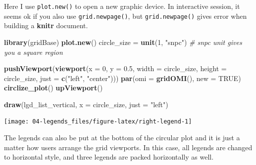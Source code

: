 \documentclass[]{book}
\newenvironment{Shaded}{\begin{snugshade}}{\end{snugshade}}
\newcommand{\KeywordTok}[1]{\textcolor[rgb]{0.13,0.29,0.53}{\textbf{#1}}}
\newcommand{\DataTypeTok}[1]{\textcolor[rgb]{0.13,0.29,0.53}{#1}}
\newcommand{\DecValTok}[1]{\textcolor[rgb]{0.00,0.00,0.81}{#1}}
\newcommand{\FloatTok}[1]{\textcolor[rgb]{0.00,0.00,0.81}{#1}}
\newcommand{\StringTok}[1]{\textcolor[rgb]{0.31,0.60,0.02}{#1}}
\newcommand{\CommentTok}[1]{\textcolor[rgb]{0.56,0.35,0.01}{\textit{#1}}}
\newcommand{\OtherTok}[1]{\textcolor[rgb]{0.56,0.35,0.01}{#1}}
\newcommand{\NormalTok}[1]{#1}
\begin{document}
Here I use \texttt{plot.new()} to open a new graphic device. In
interactive session, it seems ok if you also use
\texttt{grid.newpage()}, but \texttt{grid.newpage()} gives error when
building a \textbf{knitr} document.

\begin{Shaded}
\begin{Highlighting}[]
\KeywordTok{library}\NormalTok{(gridBase)}
\KeywordTok{plot.new}\NormalTok{()}
\NormalTok{circle_size =}\StringTok{ }\KeywordTok{unit}\NormalTok{(}\DecValTok{1}\NormalTok{, }\StringTok{"snpc"}\NormalTok{) }\CommentTok{# snpc unit gives you a square region}

\KeywordTok{pushViewport}\NormalTok{(}\KeywordTok{viewport}\NormalTok{(}\DataTypeTok{x =} \DecValTok{0}\NormalTok{, }\DataTypeTok{y =} \FloatTok{0.5}\NormalTok{, }\DataTypeTok{width =}\NormalTok{ circle_size, }\DataTypeTok{height =}\NormalTok{ circle_size,}
    \DataTypeTok{just =} \KeywordTok{c}\NormalTok{(}\StringTok{"left"}\NormalTok{, }\StringTok{"center"}\NormalTok{)))}
\KeywordTok{par}\NormalTok{(}\DataTypeTok{omi =} \KeywordTok{gridOMI}\NormalTok{(), }\DataTypeTok{new =} \OtherTok{TRUE}\NormalTok{)}
\KeywordTok{circlize_plot}\NormalTok{()}
\KeywordTok{upViewport}\NormalTok{()}

\KeywordTok{draw}\NormalTok{(lgd_list_vertical, }\DataTypeTok{x =}\NormalTok{ circle_size, }\DataTypeTok{just =} \StringTok{"left"}\NormalTok{)}
\end{Highlighting}
\end{Shaded}

\begin{center}\texttt{[image: 04-legends\_files/figure-latex/right-legend-1]} \end{center}

The legends can also be put at the bottom of the circular plot and it is
just a matter how users arrange the grid viewports. In this case, all
legends are changed to horizontal style, and three legends are packed
horizontally as well.
\end{document}
